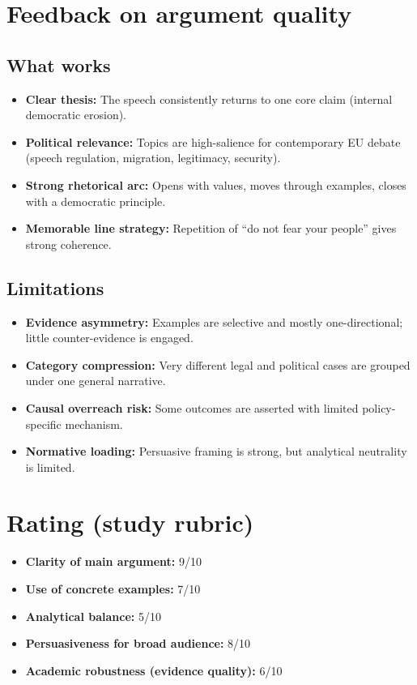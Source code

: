 \documentclass[12pt]{article}
\begin{document}
\section*{Feedback on argument quality}

\subsection*{What works}
\begin{itemize}
    \item \textbf{Clear thesis:} The speech consistently returns to one core claim (internal democratic erosion).
    \item \textbf{Political relevance:} Topics are high-salience for contemporary EU debate (speech regulation, migration, legitimacy, security).
    \item \textbf{Strong rhetorical arc:} Opens with values, moves through examples, closes with a democratic principle.
    \item \textbf{Memorable line strategy:} Repetition of ``do not fear your people'' gives strong coherence.
\end{itemize}

\subsection*{Limitations}
\begin{itemize}
    \item \textbf{Evidence asymmetry:} Examples are selective and mostly one-directional; little counter-evidence is engaged.
    \item \textbf{Category compression:} Very different legal and political cases are grouped under one general narrative.
    \item \textbf{Causal overreach risk:} Some outcomes are asserted with limited policy-specific mechanism.
    \item \textbf{Normative loading:} Persuasive framing is strong, but analytical neutrality is limited.
\end{itemize}

\section*{Rating (study rubric)}

\begin{itemize}
    \item \textbf{Clarity of main argument:} 9/10
    \item \textbf{Use of concrete examples:} 7/10
    \item \textbf{Analytical balance:} 5/10
    \item \textbf{Persuasiveness for broad audience:} 8/10
    \item \textbf{Academic robustness (evidence quality):} 6/10
\end{itemize}
\end{document}
